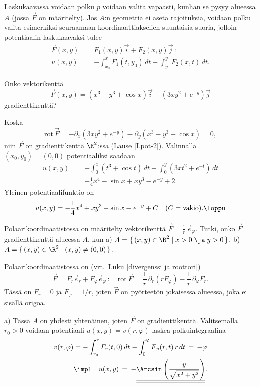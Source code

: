 Laskukaavassa voidaan polku $p$ voidaan valita vapaasti, kunhan se pysyy alueessa $A$
(jossa $\vec F$ on määritelty). Jos $A$:n geometria ei aseta rajoituksia, voidaan polku valita
esimerkiksi seuraamaan koordinaattiakselien suuntaisia suoria, jolloin potentiaalin
laskukaavaksi tulee
\begin{align*}
\vec F(x,y) &= F_1(x,y)\vec i + F_2(x,y)\vec j\,: \\
     u(x,y) &= -\int_{x_0}^x F_1(t,y_0)\,dt-\int_{y_0}^y F_2(x,t)\,dt.
\end{align*}
\begin{Exa}
Onko vektorikenttä
\[
\vec F(x,y)=(x^3-y^3+\cos x)\vec i-(3xy^2+e^{-y})\vec j
\]
gradienttikenttä?
\end{Exa}
\ratk Koska
\[
\text{rot}\, \vec F=-\partial_x(3xy^2+e^{-y})-\partial_y(x^3-y^3+\cos x)=0,
\]
niin $\vec F$ on gradienttikenttä $\R^2$:ssa (Lause \ref{Lpot-2}). Valinnalla $(x_0,y_0)=(0,0)$ 
potentiaaliksi saadaan
\begin{align*}
u(x,y) &= -\int_0^x (t^3+\cos t)\,dt+\int_0^y (3xt^2+e^{-t})\,dt \\
&= -\frac{1}{4}x^4-\sin x+xy^3-e^{-y}+2.
\end{align*}
Yleinen potentiaalifunktio on
\[
u(x,y)=-\frac{1}{4}x^4+xy^3-\sin x-e^{-y}+C\quad (C=\text{vakio}). \loppu
\]
\begin{Exa}
Polaarikoordinaatistossa on määritelty vektorikenttä $\vec F=\frac{1}{r}\,\vec e_\varphi$.
Tutki, onko $\vec F$  gradienttikenttä alueessa $A$, kun \vspace{1mm}\newline
a) $A=\{\,(x,y)\in\R^2 \; | \; x>0 \; \ja \; y>0\,\}$, \newline
b) $A=\{\,(x,y)\in\R^2 \; | \; (x,y)\neq(0,0)\,\}$.
\end{Exa}
\ratk Polaarikoordinaatistossa on (vrt.\ Luku \ref{divergenssi ja roottori})
\[
\vec F=F_r\vec e_r+F_\varphi \vec e_\varphi\,: \quad 
      \text{rot}\,\vec F=\frac{1}{r}\,\partial_r(rF_\varphi)-\frac{1}{r}\,\partial_\varphi F_r.
\]
Tässä on $F_r=0$ ja $F_\varphi=1/r$, joten $\vec F$ on pyörteetön jokaisessa alueessa, joka ei
sisällä origoa.

a) Tässä $A$ on yhdesti yhtenäinen, joten $\vec F$ on gradienttikenttä. Valitsemalla $r_0>0$
voidaan potentiaali $u(x,y)=v(r,\varphi)$ laskea polkuintegraalina
\begin{align*}
v(r,\varphi)
&= -\int_{r_0}^r F_r(t,0)\,dt-\int_0^\varphi F_\varphi(r,t)\,r\,dt \,=\, -\varphi \\ 
&\impl\quad u(x,y) \,=\, -\underline{\underline{\Arcsin\left(\frac{y}{\sqrt{x^2+y^2}}\right)}}.
\end{align*}

